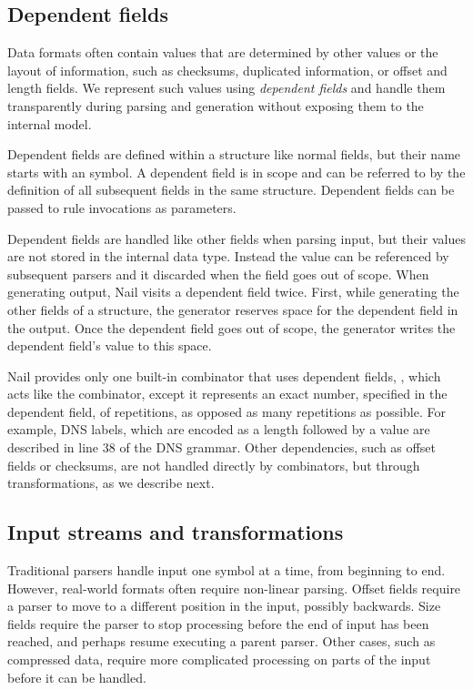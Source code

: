 \subsection{Dependent fields}
\label{s:dependent}
Data formats often contain values that are determined by other values or the layout of information,
such as checksums, duplicated information, or offset and  length fields.
We represent such values using \emph{dependent fields} and handle them transparently during
parsing and generation without exposing them to the internal model. 


Dependent fields are defined within a structure like normal fields, but their name starts with an  symbol.
A dependent field is in scope and can be referred to by the definition of all subsequent fields in
the same structure. Dependent fields can be passed to rule invocations as parameters.

Dependent fields are handled like other fields when parsing input, but their values are not stored
in the internal data type. Instead the value can be referenced by subsequent parsers and it
discarded when the field goes out of scope.
When generating output, Nail visits a dependent field twice. First, while generating the other fields of a
structure, the generator reserves space for the dependent field in the output. Once
the dependent field goes out of scope, the generator  writes the
dependent field's value to this space.

Nail provides only one built-in combinator that uses dependent fields, , which acts like
the  combinator, except it represents an exact number, specified in the dependent field, of
repetitions, as opposed as many repetitions as possible. For example, DNS labels, which
are encoded as a length followed by
a value are described in line 38 of the DNS grammar.
Other dependencies, such as offset fields or checksums, are not handled directly by combinators, but
through  transformations, as we describe next.

\subsection{Input streams and transformations}
\label{s:transforms}

Traditional parsers handle input one symbol at a time, from beginning to end.
However, real-world formats often require non-linear parsing. Offset fields require a parser to move
to a different position in the input, possibly backwards. Size fields require the parser to stop
processing before the end of input has been reached, and perhaps resume executing a parent parser.
Other cases, such as compressed data, require more complicated processing on parts of the input
before it can be handled.

